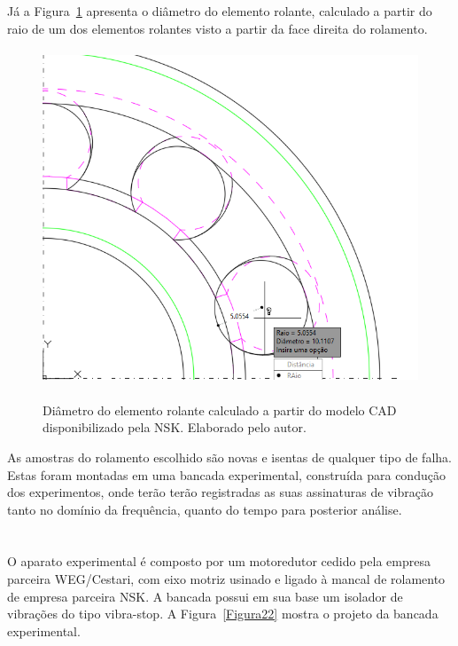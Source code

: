 \documentclass[
	12pt,				
	oneside,			
	a4paper,			
	english,			
	brazil,			
	]{abntex2ppgsi}
\begin{document}
Já a Figura~\ref{diametro_rolamento} apresenta o diâmetro do elemento rolante, calculado a partir do raio de um dos elementos rolantes visto a partir da face direita do rolamento. 

\begin{figure}[H]
\centering
\caption {Diâmetro do elemento rolante calculado a partir do modelo CAD disponibilizado pela NSK. Elaborado pelo autor.}
\includegraphics[width=\textwidth,height=100mm,keepaspectratio]{diametro_rolamento}
\label{diametro_rolamento}
\end{figure} 

As amostras do rolamento escolhido são novas e isentas de qualquer tipo de falha. Estas foram montadas em uma bancada experimental, construída para condução dos experimentos, onde terão terão registradas as suas assinaturas de vibração tanto no domínio da frequência, quanto do tempo para posterior análise. 


\section{}

O aparato experimental é composto por um motoredutor cedido pela empresa parceira WEG/Cestari, com eixo motriz usinado e ligado à mancal de rolamento de empresa parceira NSK. A bancada possui em sua base um isolador de vibrações do tipo vibra-stop. A Figura~\ref{Figura22} mostra o projeto da bancada experimental. 
\end{document}
